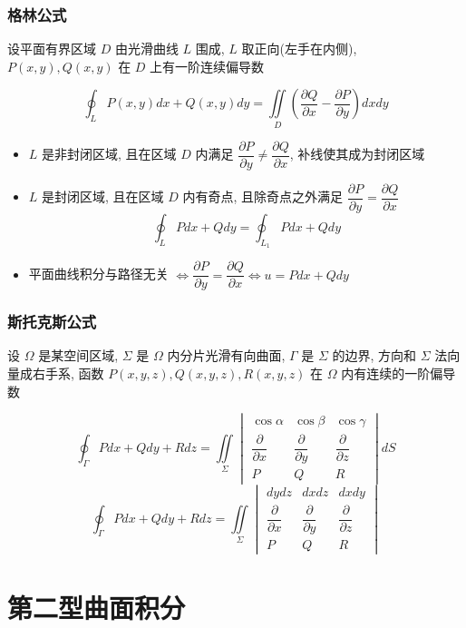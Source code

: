 \subsubsection{格林公式}
\begin{theorem}[格林公式]
	设平面有界区域 $D$ 由光滑曲线 $L$ 围成, $L$ 取正向(左手在内侧), $P(x,y),Q(x,y)$ 在 $D$ 上有一阶连续偏导数

	$$\oint_{L}P(x,y)dx+Q(x,y)dy=\iint\limits_{D}\left(\frac{\partial Q}{\partial x}-\frac{\partial P}{\partial y}\right)dxdy$$
\end{theorem}
\begin{itemize}
	\item $L$ 是非封闭区域, 且在区域 $D$ 内满足 $\dfrac{\partial P}{\partial y} \neq \dfrac{\partial Q}{\partial x}$, 补线使其成为封闭区域
	\item $L$ 是封闭区域, 且在区域 $D$ 内有奇点, 且除奇点之外满足 $\dfrac{\partial P}{\partial y} = \dfrac{\partial Q}{\partial x}$
	$$\oint_{L}Pdx+Qdy = \oint_{L_{1}}Pdx+Qdy$$
	\item 平面曲线积分与路径无关 $\Leftrightarrow \dfrac{\partial P}{\partial y} = \dfrac{\partial Q}{\partial x} \Leftrightarrow u = Pdx+ Qdy$ 
\end{itemize}
\subsubsection{斯托克斯公式}
\begin{theorem}[斯托克斯公式]
	设 $\Omega$ 是某空间区域, $\Sigma$ 是 $\Omega$ 内分片光滑有向曲面, $\Gamma$ 是 $\Sigma$ 的边界, 方向和 $\Sigma$ 法向量成右手系, 函数 $P(x,y,z),Q(x,y,z),R(x,y,z)$ 在 $\Omega$ 内有连续的一阶偏导数

	$$\oint_{\Gamma}Pdx+Qdy+Rdz=\iint\limits_{\Sigma}
	\begin{vmatrix}
		\cos\alpha&\cos\beta&\cos\gamma\\
		\dfrac{\partial}{\partial x}&\dfrac{\partial }{\partial y}&\dfrac{\partial}{\partial z}\\
		P&Q&R
	\end{vmatrix}dS $$
	$$\oint_{\Gamma}Pdx+Qdy+Rdz=\iint\limits_{\Sigma}
	\begin{vmatrix}
		dydz&dxdz&dxdy\\
		\dfrac{\partial}{\partial x}&\dfrac{\partial }{\partial y}&\dfrac{\partial}{\partial z}\\
		P&Q&R
	\end{vmatrix}$$
\end{theorem}

\section{第二型曲面积分}
